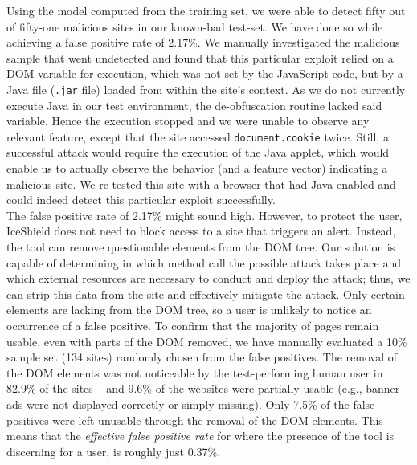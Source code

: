     Using the model computed from the training set, we were able to detect fifty out of fifty-one malicious sites in our known-bad test-set. We have done so while achieving a false positive rate of 2.17\%. We manually investigated the malicious sample that went undetected and found that this particular exploit relied on a DOM variable for execution, which was not set by the JavaScript code, but by a Java file (\texttt{.jar} file) loaded from within the site's context. As we do not currently execute Java in our test environment, the de-obfuscation routine lacked said variable. Hence the execution stopped and we were unable to observe any relevant feature, except that the site accessed \texttt{document.cookie} twice. Still, a successful attack would require the execution of the Java applet, which would enable us to actually observe the behavior (and a feature vector) indicating a malicious site. We re-tested this site with a browser that had Java enabled and could indeed detect this particular exploit successfully. \\

    The false positive rate of 2.17\% might sound high. However, to protect the user, IceShield does not need to block access to a site that triggers an alert. Instead, the tool can remove questionable elements from the DOM tree. Our solution is capable of determining in which method call the possible attack takes place and which external resources are necessary to conduct and deploy the attack; thus, we can strip this data from the site and effectively mitigate the attack. Only certain elements are lacking from the DOM tree, so a user is unlikely to notice an occurrence of a false positive. To confirm that the majority of pages remain usable, even with parts of the DOM removed, we have manually evaluated a 10\% sample set (134 sites) randomly chosen from the false positives. The removal of the DOM elements was not noticeable by the test-performing human user in 82.9\% of the sites -- and 9.6\% of the websites were partially usable (e.g., banner ads were not displayed correctly or simply missing). Only 7.5\% of the false positives were left unusable through the removal of the DOM elements. This means that the \emph{effective false positive rate} for where the presence of the tool is discerning for a user, is roughly just 0.37\%. \\

